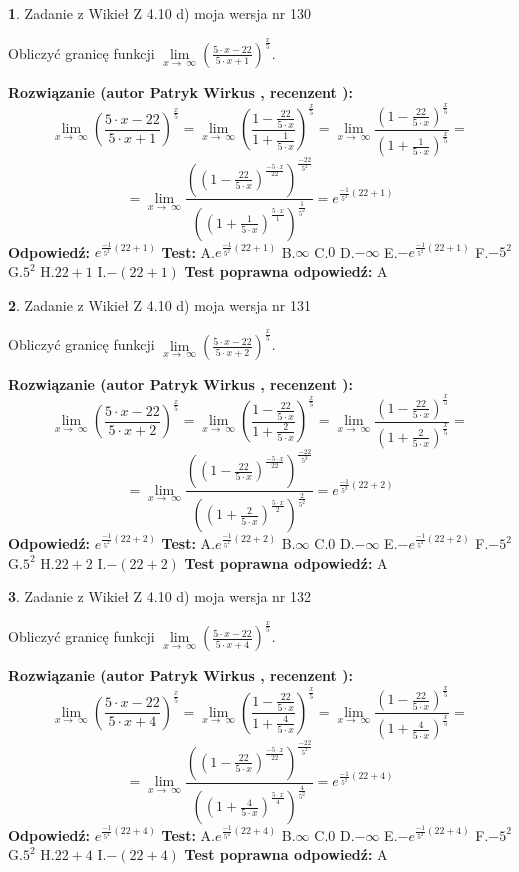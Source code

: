 \documentclass[12pt, a4paper]{article}
\theoremstyle{definition} %
\newtheorem{zad}{}
\newcommand{\zadStart}[1]{\begin{zad}#1\newline}
\newcommand{\zadStop}{\end{zad}}
\newcommand{\rozwStart}[2]{\noindent \textbf{Rozwiązanie (autor #1 , recenzent #2): }\newline}
\newcommand{\rozwStop}{\newline}
\newcommand{\odpStart}{\noindent \textbf{Odpowiedź:}\newline}
\newcommand{\odpStop}{\newline}
\newcommand{\testStart}{\noindent \textbf{Test:}\newline}
\newcommand{\testStop}{\newline}
\newcommand{\kluczStart}{\noindent \textbf{Test poprawna odpowiedź:}\newline}
\newcommand{\kluczStop}{\newline}
\begin{document}
\zadStart{Zadanie z Wikieł Z 4.10 d) moja wersja nr 130}


Obliczyć granicę funkcji  $\lim\limits_{x\to\ \infty}(\frac{5\cdot x-22}{5\cdot x+1})^{\frac{x}{5}}$.
\zadStop
\rozwStart{Patryk Wirkus}{}
$$\lim\limits_{x\to\ \infty}(\frac{5\cdot x-22}{5\cdot x+1})^{\frac{x}{5}} = \lim\limits_{x\to\ \infty}(\frac{1-\frac{22}{5\cdot x}}{1+\frac{1}{5\cdot x}})^{\frac{x}{5}}=\lim\limits_{x\to\ \infty}\frac{(1-\frac{22}{5\cdot x})^{\frac{x}{5}}}{(1+\frac{1}{5\cdot x})^{\frac{x}{5}}}=$$
$$=\lim\limits_{x\to\ \infty}\frac{((1-\frac{22}{5\cdot x})^{\frac{-5\cdot x}{22}})^{\frac{-22}{5^{2}}}}{((1+\frac{1}{5\cdot x})^{\frac{5\cdot x}{1}})^{\frac{1}{5^{2}}}}=e^{\frac{-1}{5^{2}}(22+1)}$$
\rozwStop
\odpStart
$e^{\frac{-1}{5^{2}}(22+1)}$
\odpStop
\testStart
A.$e^{\frac{-1}{5^{2}}(22+1)}$ B.$\infty$ C.$0$ D.$-\infty$ E.$-e^{\frac{-1}{5^{2}}(22+1)}$
F.$-5^{2}$ G.$5^{2}$
H.$22+1$
I.$-(22+1)$
\testStop
\kluczStart
A
\kluczStop



\zadStart{Zadanie z Wikieł Z 4.10 d) moja wersja nr 131}


Obliczyć granicę funkcji  $\lim\limits_{x\to\ \infty}(\frac{5\cdot x-22}{5\cdot x+2})^{\frac{x}{5}}$.
\zadStop
\rozwStart{Patryk Wirkus}{}
$$\lim\limits_{x\to\ \infty}(\frac{5\cdot x-22}{5\cdot x+2})^{\frac{x}{5}} = \lim\limits_{x\to\ \infty}(\frac{1-\frac{22}{5\cdot x}}{1+\frac{2}{5\cdot x}})^{\frac{x}{5}}=\lim\limits_{x\to\ \infty}\frac{(1-\frac{22}{5\cdot x})^{\frac{x}{5}}}{(1+\frac{2}{5\cdot x})^{\frac{x}{5}}}=$$
$$=\lim\limits_{x\to\ \infty}\frac{((1-\frac{22}{5\cdot x})^{\frac{-5\cdot x}{22}})^{\frac{-22}{5^{2}}}}{((1+\frac{2}{5\cdot x})^{\frac{5\cdot x}{2}})^{\frac{2}{5^{2}}}}=e^{\frac{-1}{5^{2}}(22+2)}$$
\rozwStop
\odpStart
$e^{\frac{-1}{5^{2}}(22+2)}$
\odpStop
\testStart
A.$e^{\frac{-1}{5^{2}}(22+2)}$ B.$\infty$ C.$0$ D.$-\infty$ E.$-e^{\frac{-1}{5^{2}}(22+2)}$
F.$-5^{2}$ G.$5^{2}$
H.$22+2$
I.$-(22+2)$
\testStop
\kluczStart
A
\kluczStop



\zadStart{Zadanie z Wikieł Z 4.10 d) moja wersja nr 132}


Obliczyć granicę funkcji  $\lim\limits_{x\to\ \infty}(\frac{5\cdot x-22}{5\cdot x+4})^{\frac{x}{5}}$.
\zadStop
\rozwStart{Patryk Wirkus}{}
$$\lim\limits_{x\to\ \infty}(\frac{5\cdot x-22}{5\cdot x+4})^{\frac{x}{5}} = \lim\limits_{x\to\ \infty}(\frac{1-\frac{22}{5\cdot x}}{1+\frac{4}{5\cdot x}})^{\frac{x}{5}}=\lim\limits_{x\to\ \infty}\frac{(1-\frac{22}{5\cdot x})^{\frac{x}{5}}}{(1+\frac{4}{5\cdot x})^{\frac{x}{5}}}=$$
$$=\lim\limits_{x\to\ \infty}\frac{((1-\frac{22}{5\cdot x})^{\frac{-5\cdot x}{22}})^{\frac{-22}{5^{2}}}}{((1+\frac{4}{5\cdot x})^{\frac{5\cdot x}{4}})^{\frac{4}{5^{2}}}}=e^{\frac{-1}{5^{2}}(22+4)}$$
\rozwStop
\odpStart
$e^{\frac{-1}{5^{2}}(22+4)}$
\odpStop
\testStart
A.$e^{\frac{-1}{5^{2}}(22+4)}$ B.$\infty$ C.$0$ D.$-\infty$ E.$-e^{\frac{-1}{5^{2}}(22+4)}$
F.$-5^{2}$ G.$5^{2}$
H.$22+4$
I.$-(22+4)$
\testStop
\kluczStart
A
\kluczStop
\end{document}
